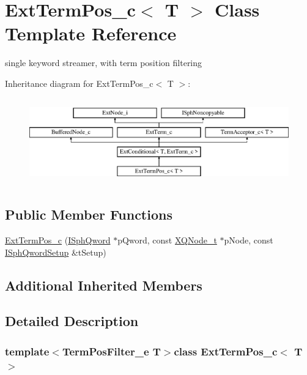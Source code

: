 \hypertarget{classExtTermPos__c}{\section{Ext\-Term\-Pos\-\_\-c$<$ T $>$ Class Template Reference}
\label{classExtTermPos__c}
}


single keyword streamer, with term position filtering  


Inheritance diagram for Ext\-Term\-Pos\-\_\-c$<$ T $>$\-:\begin{figure}[H]
\begin{center}
\leavevmode
\includegraphics[height=3.752094cm]{classExtTermPos__c}
\end{center}
\end{figure}
\subsection*{Public Member Functions}
\begin{DoxyCompactItemize}
\item 
\hyperlink{classExtTermPos__c_a7e0ddd19b11daf672625ebcab63b20be}{Ext\-Term\-Pos\-\_\-c} (\hyperlink{classISphQword}{I\-Sph\-Qword} $\ast$p\-Qword, const \hyperlink{structXQNode__t}{X\-Q\-Node\-\_\-t} $\ast$p\-Node, const \hyperlink{classISphQwordSetup}{I\-Sph\-Qword\-Setup} \&t\-Setup)
\end{DoxyCompactItemize}
\subsection*{Additional Inherited Members}


\subsection{Detailed Description}
\subsubsection*{template$<$Term\-Pos\-Filter\-\_\-e T$>$class Ext\-Term\-Pos\-\_\-c$<$ T $>$}

